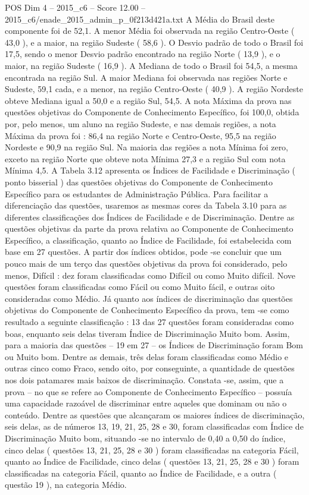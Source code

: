 \begin{textsample}{POS Dim 4 – 2015\_c6 – Score 12.00 – 2015\_c6/enade\_2015\_admin\_p\_0f213d421a.txt}
A Média do Brasil deste componente foi de 52,1.
A menor Média foi observada na região Centro-Oeste ( 43,0 ), e a maior, na região Sudeste ( 58,6 ).
O Desvio padrão de todo o Brasil foi 17,5, sendo o menor Desvio padrão encontrado na região Norte ( 13,9 ), e o maior, na região Sudeste ( 16,9 ).
A Mediana de todo o Brasil foi 54,5, a mesma encontrada na região Sul.
A maior Mediana foi observada nas regiões Norte e Sudeste, 59,1 cada, e a menor, na região Centro-Oeste ( 40,9 ).
A região Nordeste obteve Mediana igual a 50,0 e a região Sul, 54,5.
A nota Máxima da prova nas questões objetivas do Componente de Conhecimento Específico, foi 100,0, obtida por, pelo menos, um aluno na região Sudeste, e nas demais regiões, a nota Máxima da prova foi : 86,4 na região Norte e Centro-Oeste, 95,5 na região Nordeste e 90,9 na região Sul.
Na maioria das regiões a nota Mínima foi zero, exceto na região Norte que obteve nota Mínima 27,3 e a região Sul com nota Mínima 4,5.
A Tabela 3.12 apresenta os Índices de Facilidade e Discriminação ( ponto bisserial ) das questões objetivas do Componente de Conhecimento Específico para os estudantes de Administração Pública.
Para facilitar a diferenciação das questões, usaremos as mesmas cores da Tabela 3.10 para as diferentes classificações dos Índices de Facilidade e de Discriminação.
Dentre as questões objetivas da parte da prova relativa ao Componente de Conhecimento Específico, a classificação, quanto ao Índice de Facilidade, foi estabelecida com base em 27 questões.
A partir dos índices obtidos, pode -se concluir que um pouco mais de um terço das questões objetivas da prova foi considerado, pelo menos, Difícil : dez foram classificadas como Difícil ou como Muito difícil.
Nove questões foram classificadas como Fácil ou como Muito fácil, e outras oito consideradas como Médio.
Já quanto aos índices de discriminação das questões objetivas do Componente de Conhecimento Específico da prova, tem -se como resultado a seguinte classificação : 13 das 27 questões foram consideradas como boas, enquanto seis delas tiveram Índice de Discriminação Muito bom.
Assim, para a maioria das questões – 19 em 27 – os Índices de Discriminação foram Bom ou Muito bom.
Dentre as demais, três delas foram classificadas como Médio e outras cinco como Fraco, sendo oito, por conseguinte, a quantidade de questões nos dois patamares mais baixos de discriminação.
Constata -se, assim, que a prova – no que se refere ao Componente de Conhecimento Específico – possuía uma capacidade razoável de discriminar entre aqueles que dominam ou não o conteúdo.
Dentre as questões que alcançaram os maiores índices de discriminação, seis delas, as de números 13, 19, 21, 25, 28 e 30, foram classificadas com Índice de Discriminação Muito bom, situando -se no intervalo de 0,40 a 0,50 do índice, cinco delas ( questões 13, 21, 25, 28 e 30 ) foram classificadas na categoria Fácil, quanto ao Índice de Facilidade, cinco delas ( questões 13, 21, 25, 28 e 30 ) foram classificadas na categoria Fácil, quanto ao Índice de Facilidade, e a outra ( questão 19 ), na categoria Médio.

\end{textsample}
